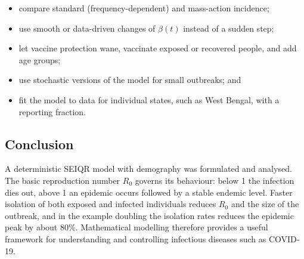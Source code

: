 \documentclass[12pt,a4paper]{article}
\theoremstyle{definition}
\begin{document}
\begin{itemize}
\item compare standard (frequency-dependent) and mass-action incidence;
\item use smooth or data-driven changes of $\beta (t)$ instead of a sudden step;
\item let vaccine protection wane, vaccinate exposed or recovered people, and add age groups;
\item use stochastic versions of the model for small outbreaks; and
\item fit the model to data for individual states, such as West Bengal, with a reporting fraction.
\end{itemize}

\subsection{Conclusion}

A deterministic SEIQR model with demography was formulated and analysed. The basic reproduction number $R_{0}$ governs its behaviour: below 1 the infection dies out, above 1 an epidemic occurs followed by a stable endemic level. Faster isolation of both exposed and infected individuals reduces $R_{0}$ and the size of the outbreak, and in the example doubling the isolation rates reduces the epidemic peak by about 80\%. Mathematical modelling therefore provides a useful framework for understanding and controlling infectious diseases such as COVID-19.
\end{document}
